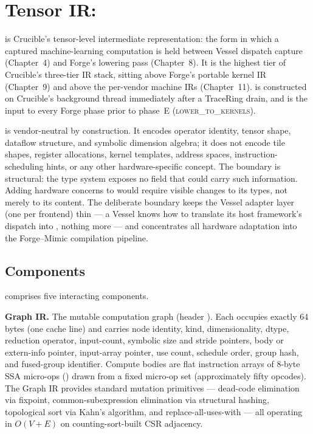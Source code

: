 
\section{Tensor IR: }
\label{sec:ir001}

 is Crucible's tensor-level intermediate representation: the form in which a captured machine-learning computation is held between Vessel dispatch capture (Chapter~4) and Forge's lowering pass (Chapter~8).
It is the highest tier of Crucible's three-tier IR stack, sitting above Forge's portable kernel IR  (Chapter~9) and above the per-vendor machine IRs  (Chapter~11).
 is constructed on Crucible's background thread immediately after a TraceRing drain, and is the input to every Forge phase prior to phase~E (\textsc{lower\_to\_kernels}).

 is vendor-neutral by construction.
It encodes operator identity, tensor shape, dataflow structure, and symbolic dimension algebra; it does not encode tile shapes, register allocations, kernel templates, address spaces, instruction-scheduling hints, or any other hardware-specific concept.
The boundary is structural: the  type system exposes no field that could carry such information.
Adding hardware concerns to  would require visible changes to its types, not merely to its content.
The deliberate boundary keeps the Vessel adapter layer (one per frontend) thin --- a Vessel knows how to translate its host framework's dispatch into , nothing more --- and concentrates all hardware adaptation into the Forge--Mimic compilation pipeline.

\subsection{Components}
\label{sec:ir001-components}

 comprises five interacting components.

\textbf{Graph IR.}
The mutable computation graph (header ).
Each  occupies exactly 64 bytes (one cache line) and carries node identity, kind, dimensionality, dtype, reduction operator, input-count, symbolic size and stride pointers, body or extern-info pointer, input-array pointer, use count, schedule order, group hash, and fused-group identifier.
Compute bodies are flat instruction arrays of 8-byte SSA micro-ops () drawn from a fixed micro-op set (approximately fifty opcodes).
The Graph IR provides standard mutation primitives --- dead-code elimination via fixpoint, common-subexpression elimination via structural hashing, topological sort via Kahn's algorithm, and replace-all-uses-with --- all operating in $O(V{+}E)$ on counting-sort-built CSR adjacency.

